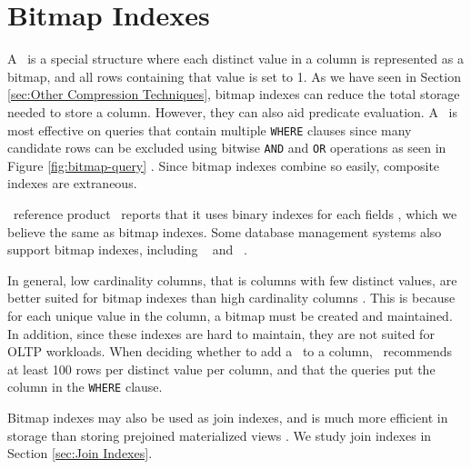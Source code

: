 \section{Bitmap Indexes}
\label{sec:Bitmap Indexes}
A \biti~is a special structure where each distinct value in a column is represented as a bitmap, and all rows containing that value is set to 1. As we have seen in Section \ref{sec:Other Compression Techniques}, bitmap indexes can reduce the total storage needed to store a column. However, they can also aid predicate evaluation. A \biti~is most effective on queries that contain multiple \texttt{WHERE} clauses since many candidate rows can be excluded using bitwise \texttt{AND} and \texttt{OR} operations as seen in Figure \ref{fig:bitmap-query} \cite{noauthor_undated-hp}. Since bitmap indexes combine so easily, composite indexes are extraneous. 

\genusSoftware~reference product \qlikview~reports that it uses binary indexes for each fields \cite{Qlik2011-ef}, which we believe the same as bitmap indexes. Some database management systems also support bitmap indexes, including \oracle~\cite{noauthor_undated-hp} and \ibm~\cite{Raman2013-em}.

In general, low cardinality columns, that is columns with few distinct values, are better suited for bitmap indexes than high cardinality columns \cite{noauthor_undated-hp}. This is because for each unique value in the column, a bitmap must be created and maintained. In addition, since these indexes are hard to maintain, they are not suited for OLTP workloads. When deciding whether to add a \biti~to a column, \oracle~recommends at least 100 rows per distinct value per column, and that the queries put the column in the \texttt{WHERE} clause.

Bitmap indexes may also be used as join indexes, and is much more efficient in storage than storing prejoined materialized views \cite{noauthor_undated-hp}. We study join indexes in Section \ref{sec:Join Indexes}.


